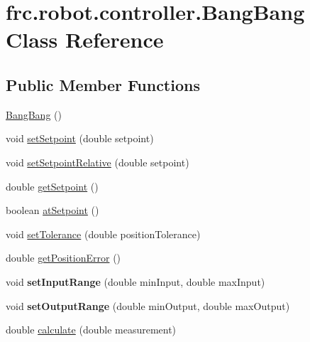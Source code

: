 \hypertarget{classfrc_1_1robot_1_1controller_1_1_bang_bang}{}\section{frc.\+robot.\+controller.\+Bang\+Bang Class Reference}
\label{classfrc_1_1robot_1_1controller_1_1_bang_bang}
\subsection*{Public Member Functions}
\begin{DoxyCompactItemize}
\item 
\mbox{\hyperlink{classfrc_1_1robot_1_1controller_1_1_bang_bang_a7461de01f9b1e5329584739591bdf7ae}{Bang\+Bang}} ()
\item 
void \mbox{\hyperlink{classfrc_1_1robot_1_1controller_1_1_bang_bang_aae64a4adfa43dc9caddc4e501cfbbcbf}{set\+Setpoint}} (double setpoint)
\item 
void \mbox{\hyperlink{classfrc_1_1robot_1_1controller_1_1_bang_bang_a2ec0f35d4dd199a6ec8003afb2c227da}{set\+Setpoint\+Relative}} (double setpoint)
\item 
double \mbox{\hyperlink{classfrc_1_1robot_1_1controller_1_1_bang_bang_a646bfc447daa1e708ad02810b5dcbb2a}{get\+Setpoint}} ()
\item 
boolean \mbox{\hyperlink{classfrc_1_1robot_1_1controller_1_1_bang_bang_a58ac0677dcbaa8c8f8a609fa2f73867e}{at\+Setpoint}} ()
\item 
void \mbox{\hyperlink{classfrc_1_1robot_1_1controller_1_1_bang_bang_a5fa0322cdabcf45f3a8f5bccdf0f9eff}{set\+Tolerance}} (double position\+Tolerance)
\item 
double \mbox{\hyperlink{classfrc_1_1robot_1_1controller_1_1_bang_bang_a5f5b51419c46afefe241d52b932fca17}{get\+Position\+Error}} ()
\item 
\mbox{\label{classfrc_1_1robot_1_1controller_1_1_bang_bang_ad06053ea2c39254c323706af3ebd1d49}} 
void {\bfseries set\+Input\+Range} (double min\+Input, double max\+Input)
\item 
\mbox{\label{classfrc_1_1robot_1_1controller_1_1_bang_bang_a6e79841291f9168ede7720941ebb4a6a}} 
void {\bfseries set\+Output\+Range} (double min\+Output, double max\+Output)
\item 
double \mbox{\hyperlink{classfrc_1_1robot_1_1controller_1_1_bang_bang_a02c8b64948151db1265400764f32267e}{calculate}} (double measurement)
\end{DoxyCompactItemize}

